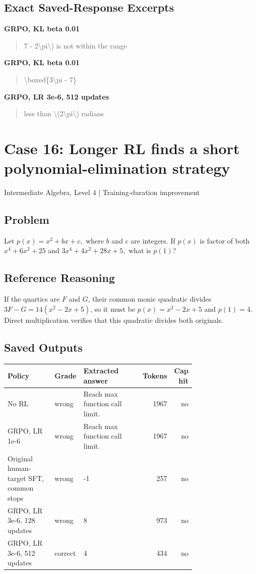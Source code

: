 \documentclass[10pt,letterpaper]{article}
\begin{document}
\subsection*{Exact Saved-Response Excerpts}
\textbf{GRPO, KL beta 0.01}
\begin{quote}\small\raggedright 7 - 2\textbackslash{}pi\textbackslash{}) is not within the range\end{quote}
\textbf{GRPO, KL beta 0.01}
\begin{quote}\small\raggedright \textbackslash{}boxed\{3\textbackslash{}pi - 7\}\end{quote}
\textbf{GRPO, LR 3e-6, 512 updates}
\begin{quote}\small\raggedright less than \textbackslash{}(2\textbackslash{}pi\textbackslash{}) radians\end{quote}
\clearpage\section*{Case 16: Longer RL finds a short polynomial-elimination strategy}
Intermediate Algebra, Level 4 | Training-duration improvement
\subsection*{Problem}
Let $p(x) = x^2 + bx + c,$ where $b$ and $c$ are integers.  If $p(x)$ is factor of both $x^4 + 6x^2 + 25$ and $3x^4 + 4x^ 2+ 28x + 5,$ what is $p(1)$?
\subsection*{Reference Reasoning}
If the quartics are $F$ and $G$, their common monic quadratic divides $3F-G=14(x^2-2x+5)$, so it must be $p(x)=x^2-2x+5$ and $p(1)=4$. Direct multiplication verifies that this quadratic divides both originals.
\subsection*{Saved Outputs}
\small\begin{longtable}{p{0.29\linewidth}p{0.10\linewidth}p{0.35\linewidth}rr}\toprule Policy & Grade & Extracted answer & Tokens & Cap hit\\\midrule
No RL & wrong & Reach max function call limit. & 1967 & no\\
GRPO, LR 1e-6 & wrong & Reach max function call limit. & 1967 & no\\
Original human-target SFT, common stops & wrong & -1 & 257 & no\\
GRPO, LR 3e-6, 128 updates & wrong & 8 & 973 & no\\
GRPO, LR 3e-6, 512 updates & correct & 4 & 434 & no\\
\bottomrule\end{longtable}\normalsize
\end{document}
